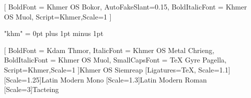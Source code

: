 \usepackage[no-math]{fontspec}
\setsansfont{Khmer OS Siemreap}[
	BoldFont = Khmer OS Bokor,
	AutoFakeSlant=0.15,
	BoldItalicFont = Khmer OS Muol,
	Script=Khmer,Scale=1
]
\usepackage[Khmer, Latin]{ucharclasses}
\usepackage{etoolbox}
\XeTeXlinebreaklocale "khm"
\XeTeXlinebreakskip = 0pt plus 1pt minus 1pt

\newfontfamily{\khmerfamily}
[
	BoldFont = Kdam Thmor,
	ItalicFont = Khmer OS Metal Chrieng,
	BoldItalicFont = Khmer OS Muol,
	SmallCapsFont = TeX Gyre Pagella,
	Script=Khmer,Scale=1
]{Khmer OS Siemreap}
[Ligatures=TeX, Scale=1.1] 
\newfontfamily{\monofamily}[Scale=1.25]{Latin Modern Mono}
\newfontfamily{\latinfamily}[Scale=1.3]{Latin Modern Roman}
\newfontfamily{\tacteingfamily}[Scale=3]{Tacteing}

\newrobustcmd{\englishfont}{\englishfamily\let\currentenglish\englishfamily }
\newrobustcmd{\khmerfont}{\khmerfamily\let\currentkhmer\khmerfamily}
\newrobustcmd{\mono}{\monofamily\let\currentenglish\monofamily }
\newrobustcmd{\en}{\latinfamily\let\currentenglish\latinfamily}
\newrobustcmd{\tacteing}{\tacteingfamily\let\currentenglish\tacteingfamily}



\khmerfont\englishfont
\setTransitionsForLatin{\currentenglish}{\currentkhmer}

\renewcommand{\ttfamily}{\mono}


\usepackage{bbold}
\let\altmathbb\mathbb
\AtBeginDocument{\let\mathbb\altmathbb}

\let\temp\rmdefault
\usepackage{mathpazo}
\let\rmdefault\temp



\newcommand{\kml}
{
	\fontspec[
		Script=Khmer, Scale=1,
		AutoFakeBold=1, AutoFakeSlant=0.25
	] {Khmer OS Muol Light}
	\selectfont
}

\newcommand{\km}
{
	\fontspec[
		Script=Khmer, Scale=1,
		AutoFakeBold=1, AutoFakeSlant=0.25
	] {Khmer OS Muol}
	\selectfont
}

\newcommand{\kpali}
{
	\fontspec[
		Script=Khmer, Scale=1,
		AutoFakeBold=1, AutoFakeSlant=0.25
	] {Khmer OS Muol Pali}
	\selectfont
}

\makeatletter
\def\khmer#1{\expandafter\@khmer\csname c@#1\endcsname}
\def\@khmer#1{\expandafter\@@khmer\number#1\@nil}
\def\@@khmer#1{%
	\ifx#1\@nil%
	\else%
	\ifcase#1 ០\or ១\or ២\or ៣\or ៤\or ៥\or ៦\or ៧\or ៨\or ៩\fi%
	\expandafter\@@khmer%
	 \fi}
	 
